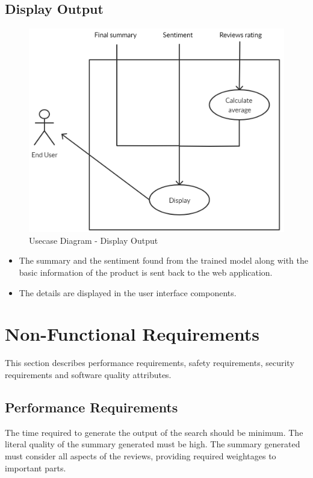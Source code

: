 \documentclass[11pt]{report}
\begin{document}
\subsection{Display Output}

\vspace{0.5cm}
\begin{figure}[H]
\centering
\includegraphics[scale=0.5]{images/output_usecase.png}
\caption{Usecase Diagram - Display Output}
\label{fig:usecase6}
\end{figure}

\begin{itemize}
    \item The summary and the sentiment found from the trained model along with the basic information of the product is sent back to the web application.
    \item The details are displayed in the user interface components. 
\end{itemize}

\newpage
\section{Non-Functional Requirements}    
This section describes performance requirements, safety requirements, security requirements and software quality attributes.

\subsection{Performance Requirements}
The time required to generate the output of the search should be minimum. The literal quality of the summary generated must be high. The summary generated must consider all aspects of the reviews, providing required weightages to important parts. 
\end{document}
